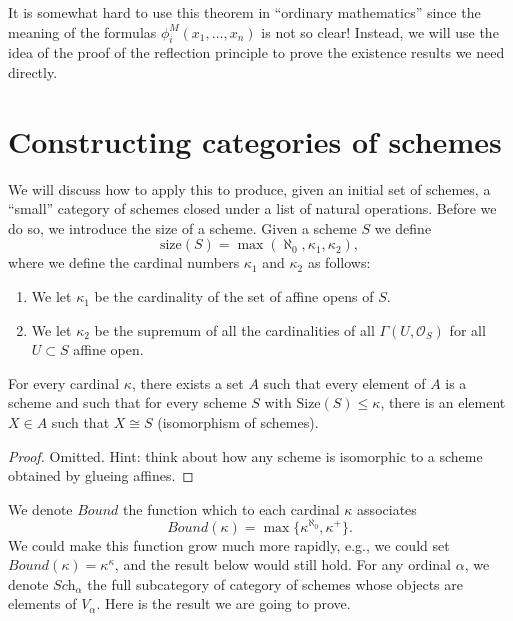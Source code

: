 \medskip\noindent
It is somewhat hard to use this theorem in ``ordinary mathematics''
since the meaning of the formulas $\phi_i^M(x_1, \ldots, x_n)$
is not so clear! Instead, we will use the idea of the proof of the
reflection principle to prove the existence results we need directly.

\section{Constructing categories of schemes}
\label{section-categories-schemes}

\noindent
We will discuss how to apply this to produce, given an initial
set of schemes, a ``small'' category of schemes closed under
a list of natural operations. Before we do so, we introduce the
size of a scheme. Given a scheme $S$ we define
$$
\text{size}(S) = \max(\aleph_0, \kappa_1, \kappa_2),
$$
where we define the cardinal numbers $\kappa_1$ and $\kappa_2$ as follows:
\begin{enumerate}
\item We let $\kappa_1$ be the cardinality of the set of affine opens of $S$.
\item We let $\kappa_2$ be the supremum of all the cardinalities of
all $\Gamma(U, \mathcal{O}_S)$ for all $U \subset S$ affine open.
\end{enumerate}

\begin{lemma}
\label{lemma-bounded-size}
For every cardinal $\kappa$, there exists a set $A$ such
that every element of $A$ is a scheme and such that for every
scheme $S$ with $\text{Size}(S) \leq \kappa$, there is
an element $X \in A$ such that $X \cong S$ (isomorphism
of schemes).
\end{lemma}

\begin{proof}
Omitted. Hint: think about how any scheme is isomorphic to a scheme
obtained by glueing affines.
\end{proof}

\noindent
We denote $Bound$ the function which to each
cardinal $\kappa$ associates
\begin{equation}
\label{equation-bound}
Bound(\kappa) = \max\{\kappa^{\aleph_0}, \kappa^+\}.
\end{equation}
We could make this function grow much more rapidly, e.g., we could
set $Bound(\kappa) = \kappa^\kappa$, and the result below would still hold.
For any ordinal $\alpha$, we denote $\textit{Sch}_\alpha$ the full
subcategory of category of schemes whose objects are elements of
$V_\alpha$. Here is the result we are going to prove.

